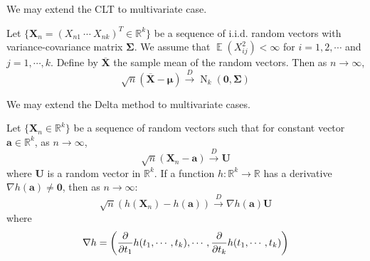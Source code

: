 \documentclass{huhtakm-template-book-v2}
\DeclareMathOperator{\E}{\mathbb{E}}
\DeclareMathOperator{\N}{N}
\begin{document}
\newpage
We may extend the CLT to multivariate case.
\begin{thm}
	Let $\{\mathbf{X}_{n}=(X_{n1}\ \cdots\ X_{nk})^{T}\in\mathbb{R}^{k}\}$ be a sequence of i.i.d. random vectors with variance-covariance matrix $\mathbf{\Sigma}$. We assume that $\E(X_{ij}^{2})<\infty$ for $i=1,2,\cdots$ and $j=1,\cdots,k$. Define by $\mathbf{\overline{X}}$ the sample mean of the random vectors. Then as $n\to\infty$,
	\begin{equation*}
		\sqrt{n}(\mathbf{\overline{X}}-\boldsymbol{\mu})\xrightarrow{D}\N_{k}(\mathbf{0},\mathbf{\Sigma})
	\end{equation*}
\end{thm}
We may extend the Delta method to multivariate cases.
\begin{thm}
	Let $\{\mathbf{X}_{n}\in\mathbb{R}^{k}\}$ be a sequence of random vectors such that for constant vector $\mathbf{a}\in\mathbb{R}^{k}$, as $n\to\infty$,
	\begin{equation*}
		\sqrt{n}(\mathbf{X}_{n}-\mathbf{a})\xrightarrow{D}\mathbf{U}
	\end{equation*}
	where $\mathbf{U}$ is a random vector in $\mathbb{R}^{k}$. If a function $h:\mathbb{R}^{k}\to\mathbb{R}$ has a derivative $\nabla h(\mathbf{a})\neq\mathbf{0}$, then as $n\to\infty$:
	\begin{equation*}
		\sqrt{n}(h(\mathbf{X}_{n})-h(\mathbf{a}))\xrightarrow{D}\nabla h(\mathbf{a})\mathbf{U}
	\end{equation*}
	where
	\begin{equation*}
		\nabla h=\left(\pdv*[order=1]{h(t_{1},\cdots,t_{k})}{t_{1}},\cdots,\pdv*[order=1]{h(t_{1},\cdots,t_{k})}{t_{k}}\right)
	\end{equation*}
\end{thm}
\end{document}

